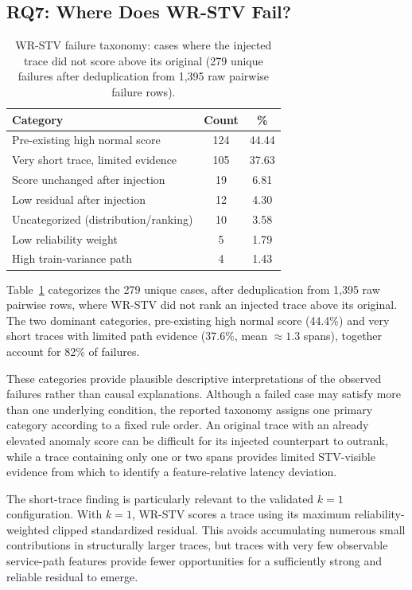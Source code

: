 \documentclass[informatics,article,submit,moreauthors]{Definitions/mdpi}
\newcommand{\rev}[1]{{\color{revisionblue}#1}}
\begin{document}
\subsection{RQ7: Where Does WR-STV Fail?}
\begin{table}[t]
	\centering
	\caption{WR-STV failure taxonomy: cases where the injected trace did not
		score above its original (279 unique failures after deduplication from
		1{,}395 raw pairwise failure rows).}
	\label{tab:failure-categories}
	\begin{tabular}{lcc}
		\toprule
		\textbf{Category} & \textbf{Count} & \textbf{\%} \\
		\midrule
		Pre-existing high normal score       & 124 & 44.44 \\
		Very short trace, limited evidence   & 105 & 37.63 \\
		Score unchanged after injection      & 19  & 6.81 \\
		Low residual after injection         & 12  & 4.30 \\
		Uncategorized (distribution/ranking) & 10  & 3.58 \\
		Low reliability weight               & 5   & 1.79 \\
		High train-variance path             & 4   & 1.43 \\
		\bottomrule
	\end{tabular}
\end{table}
Table~\ref{tab:failure-categories} categorizes the 279 unique cases, after deduplication
from 1{,}395 raw pairwise rows, where WR-STV did not rank an injected trace above its
original. The two dominant categories, pre-existing high normal score (44.4\%) and very
short traces with limited path evidence (37.6\%, mean $\approx 1.3$ spans), together
account for 82\% of failures.

\rev{These categories provide plausible descriptive
interpretations of the observed failures rather than causal explanations. Although a
failed case may satisfy more than one underlying condition, the reported taxonomy assigns
one primary category according to a fixed rule order. An original trace with an already
elevated anomaly score can be difficult for its injected counterpart to outrank, while
a trace containing only one or two spans provides limited STV-visible evidence from which
to identify a feature-relative latency deviation.}

\rev{The short-trace finding is
particularly relevant to the validated $k=1$ configuration. With $k=1$, WR-STV scores
a trace using its maximum reliability-weighted clipped standardized residual. This avoids
accumulating numerous small contributions in structurally larger traces, but traces with
very few observable service-path features provide fewer opportunities for a sufficiently
strong and reliable residual to emerge.}
\end{document}
